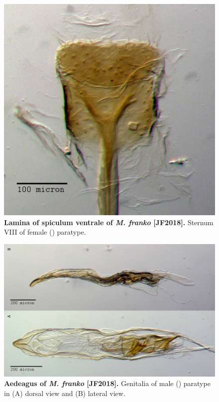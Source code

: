 \documentclass[fleqn,10pt,lineno]{wlpeerj} %
\begin{document}
\begin{figure}[h]
	\centering
	\includegraphics[width=\textwidth]{figure21.jpg}
	\caption{\textbf{Lamina of spiculum ventrale of \textit{M. franko} [JF2018].} Sternum VIII of female (\female) paratype.}
	\label{fig:franko_lamina}
\end{figure}

\begin{figure}[h]
	\centering
	\begin{sideways}
		\includegraphics[width=0.95\textheight]{figure22.jpg}
	\end{sideways}
	\caption{\textbf{Aedeagus of \textit{M. franko} [JF2018].} Genitalia of male (\male) paratype in (A) dorsal view and (B) lateral view.}
	\label{fig:franko_aedeagus}
\end{figure}
\end{document}
